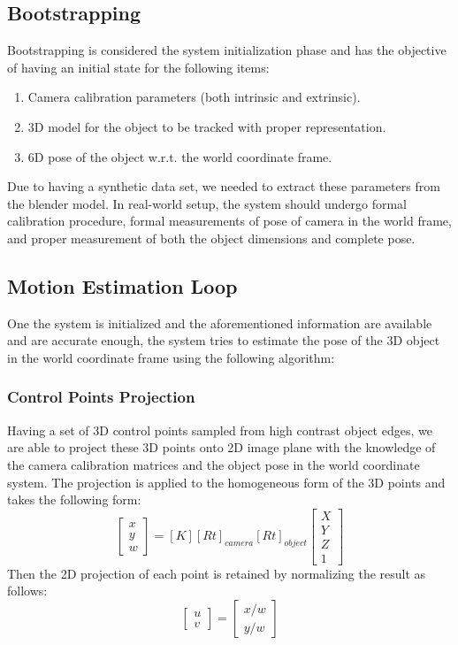 \documentclass{article}
\begin{document}
\subsection{Bootstrapping}
Bootstrapping is considered the system initialization phase and has the objective of having an initial state for the following items:
\begin{enumerate}
\item Camera calibration parameters (both intrinsic and extrinsic).
\item 3D model for the object to be tracked with proper representation.
\item 6D pose of the object w.r.t. the world coordinate frame.
\end{enumerate}
Due to having a synthetic data set, we needed to extract these parameters from the blender model. In real-world setup, the system should undergo formal calibration procedure, formal measurements of pose of camera in the world frame, and proper measurement of both the object dimensions and complete pose.

\subsection{Motion Estimation Loop}
One the system is initialized and the aforementioned information are available and are accurate enough, the system tries to estimate the pose of the 3D object in the world coordinate frame using the following algorithm:


\subsubsection{Control Points Projection}
Having a set of 3D control points sampled from high contrast object edges, we are able to project these 3D points onto 2D image plane with the knowledge of the camera calibration matrices and the object pose in the world coordinate system. The projection is applied to the homogeneous form of the 3D points and takes the following form:
\begin{equation}
\begin{bmatrix}
x \\ y \\ w 
\end{bmatrix} = [K][Rt]_{camera} [Rt]_{object} \begin{bmatrix}
X \\ Y \\ Z \\ 1
\end{bmatrix}
\end{equation}
Then the 2D projection of each point is retained by normalizing the result as follows:
\begin{equation}
\begin{bmatrix}
u \\ v
\end{bmatrix} = \begin{bmatrix}
x/w \\ y/w
\end{bmatrix}
\end{equation}
\end{document}
